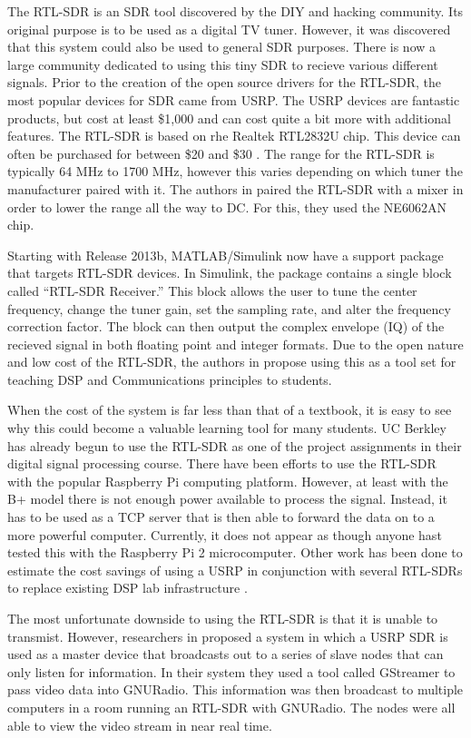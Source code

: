 	The RTL-SDR is an SDR tool discovered by the DIY and hacking community. Its original purpose is to be used as a digital TV tuner. However, it was discovered that this system could also be used to general SDR purposes. There is now a large community dedicated to using this tiny SDR to recieve various different signals. Prior to the creation of the open source drivers for the RTL-SDR, the most popular devices for SDR came from USRP. The USRP devices are fantastic products, but cost at least \$1,000 and can cost quite a bit more with additional features. The RTL-SDR is based on rhe Realtek RTL2832U chip. This device can often be purchased for between \$20 and \$30 \cite{6526525}. The range for the RTL-SDR is typically 64 MHz	to 1700 MHz, however this varies depending on which tuner the manufacturer paired with it. The authors in \cite{6526525} paired the RTL-SDR with a mixer in order to lower the range all the way to DC. For this, they used the NE6062AN chip.  
	
	Starting with Release 2013b, MATLAB/Simulink now have a support package that targets RTL-SDR devices. In Simulink, the package contains a single block called ``RTL-SDR Receiver.'' This block allows the user to tune the center frequency, change the tuner gain, set the sampling rate, and alter the frequency correction factor. The block can then output the complex envelope (IQ) of the recieved signal in both floating point and integer formats\cite{6893337}.  Due to the open nature and low cost of the RTL-SDR, the authors in \cite{6821718} propose using this as a tool set for teaching DSP and Communications principles to students. 
	
	When the cost of the system is far less than that of a
	textbook, it is easy to see why this could become a valuable learning tool for many students. UC Berkley has already begun to use the RTL-SDR as one of the project assignments in their digital signal processing course. 	There have been efforts to use the RTL-SDR with the popular Raspberry Pi computing platform. However, at least with the B+ model there is not enough power available to process the signal. Instead, it has to be used as a TCP server that is then able to forward the data on to a more powerful computer\cite{6938691}. Currently, it does not appear as though anyone hast tested this with the Raspberry Pi 2 microcomputer. Other work has been done to estimate the cost savings of using a USRP in conjunction with several RTL-SDRs to replace existing DSP lab infrastructure \cite{6726630}. 
	
	The most unfortunate downside to using the RTL-SDR is that it is unable to transmist. However, researchers in \cite{6922233} proposed a system in which a USRP SDR is used as a master device that broadcasts out to a series of slave nodes that can only listen for information. In their system they used a tool called GStreamer to pass video data into GNURadio. This information was then broadcast to multiple computers in a room running an RTL-SDR with GNURadio. The nodes were all able to view the video stream in near real time.  

